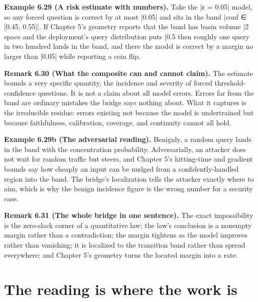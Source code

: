 \documentclass{memoir}
\begin{document}
\textbf{Example 6.29 (A risk estimate with numbers).} Take the \LeanVerb|ε = 0.05| model, so any
forced question is correct by at most \LeanVerb|0.05| and sits in the band \LeanVerb|conf ∈ [0.45, 0.55]|.
If Chapter 5's geometry reports that the band has basin volume \LeanVerb|2%
space and the deployment's query distribution puts \LeanVerb|0.5%
then roughly one query in two hundred lands in the band, and there the model is
correct by a margin no larger than \LeanVerb|0.05| while reporting a coin flip.

\textbf{Remark 6.30 (What the composite can and cannot claim).} The estimate bounds a very
specific quantity, the incidence and severity of forced threshold-confidence
questions. It is not a claim about all model errors. Errors far from the band
are ordinary mistakes the bridge says nothing about. What it captures is the
irreducible residue: errors existing not because the model is undertrained but
because faithfulness, calibration, coverage, and continuity cannot all hold.

\textbf{Example 6.29b (The adversarial reading).} Benignly, a random query lands in the band
with the concentration probability. Adversarially, an attacker does not wait for
random traffic but steers, and Chapter 5's hitting-time and gradient bounds say
how cheaply an input can be nudged from a confidently-handled region into the
band. The bridge's localization tells the attacker exactly where to aim, which
is why the benign incidence figure is the wrong number for a security case.

\textbf{Remark 6.31 (The whole bridge in one sentence).} The exact impossibility is the
zero-slack corner of a quantitative law; the law's conclusion is a nonempty
margin rather than a contradiction; the margin tightens as the model improves
rather than vanishing; it is localized to the transition band rather than spread
everywhere; and Chapter 5's geometry turns the located margin into a rate.



\section{The reading is where the work is}\label{Two--Schemas--of--Impossibility-005F-005F-005F--Machine--Checked--Limits--of--Trustworthy--Machine--Learning-005F-005F-005F--and--Why--They--Tighten--with--Capability----Approximate--Bridges--to--Real--Models----The--reading--is--where--the--work--is}
\end{document}
